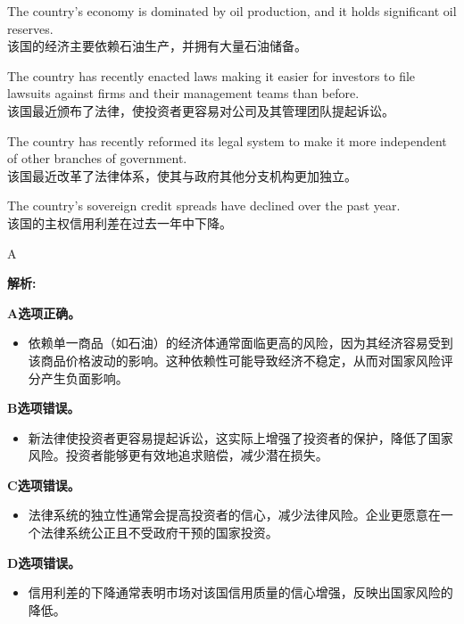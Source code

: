 \documentclass{article}
\newenvironment{explanation}
{\textbf{解析:}\par}
{\par}
\begin{document}
\begin{choices}
    \item The country’s economy is dominated by oil production, and it holds significant oil reserves.\\ 
    该国的经济主要依赖石油生产，并拥有大量石油储备。
    \item The country has recently enacted laws making it easier for investors to file lawsuits against firms and their management teams than before.\\ 
    该国最近颁布了法律，使投资者更容易对公司及其管理团队提起诉讼。
    \item The country has recently reformed its legal system to make it more independent of other branches of government.\\ 
    该国最近改革了法律体系，使其与政府其他分支机构更加独立。
    \item The country’s sovereign credit spreads have declined over the past year.\\ 
    该国的主权信用利差在过去一年中下降。
\end{choices}

\begin{correctanswer}
    A
\end{correctanswer}

\begin{explanation}
    \textbf{A选项正确。} 
    \begin{itemize}
        \item 依赖单一商品（如石油）的经济体通常面临更高的风险，因为其经济容易受到该商品价格波动的影响。这种依赖性可能导致经济不稳定，从而对国家风险评分产生负面影响。
    \end{itemize}

    \textbf{B选项错误。} 
    \begin{itemize}
        \item 新法律使投资者更容易提起诉讼，这实际上增强了投资者的保护，降低了国家风险。投资者能够更有效地追求赔偿，减少潜在损失。
    \end{itemize}

    \textbf{C选项错误。} 
    \begin{itemize}
        \item 法律系统的独立性通常会提高投资者的信心，减少法律风险。企业更愿意在一个法律系统公正且不受政府干预的国家投资。
    \end{itemize}

    \textbf{D选项错误。} 
    \begin{itemize}
        \item 信用利差的下降通常表明市场对该国信用质量的信心增强，反映出国家风险的降低。
    \end{itemize}
\end{explanation}
\end{document}

